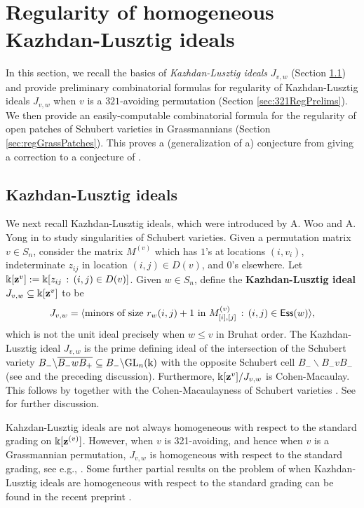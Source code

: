 \documentclass[12pt]{amsart}
\theoremstyle{definition}
\theoremstyle{remark}
\numberwithin{equation}{section}
\newcommand{\Ess}{{\sf Ess}}
\newcommand{\GL}{{\rm GL}}
\begin{document}
\section{Regularity of homogeneous Kazhdan-Lusztig ideals}\label{sec:vexGr}

In this section, we recall the basics of \emph{Kazhdan-Lusztig ideals} $J_{v,w}$ (Section \ref{sec:KLBackground}) and provide preliminary combinatorial formulas for regularity of Kazhdan-Lusztig ideals $J_{v,w}$ when $v$ is a $321$-avoiding permutation (Section \ref{sec:321RegPrelims}). We then provide an easily-computable  combinatorial formula for the regularity of open patches of Schubert varieties in Grassmannians (Section \ref{sec:regGrassPatches}). This proves a (generalization of a) conjecture from \cite{RRRSW} giving a correction to a conjecture of \cite{KLSS}.

\subsection{Kazhdan-Lusztig ideals}\label{sec:KLBackground}
We next recall Kazhdan-Lusztig ideals, which were introduced by A. Woo and A. Yong in \cite{WooYongSings} to study singularities of Schubert varieties. Given a permutation matrix $v\in S_n$, consider the matrix $M^{(v)}$ which has $1$'s at locations $(i,v_i)$,  indeterminate $z_{ij}$ in location $(i,j)\in D(v)$, and $0$'s elsewhere. Let $\Bbbk[{\bf z}^v]:= \Bbbk[z_{ij}\,:  \,(i,j)\in D(v)]$. Given $w\in S_n$, define the \textbf{Kazhdan-Lusztig ideal} $J_{v,w}\subseteq \Bbbk[{\bf z}^v]$ to be
\[
J_{v,w} = \langle \text{minors of size } r_w(i,j)+1 \text{ in } M^{(v)}_{[i],[j]}\,:  \, (i,j)\in \Ess(w)\rangle,
\]
which is not the unit ideal precisely when $w\leq v$ in Bruhat order. 
 The Kazhdan-Lusztig ideal $J_{v,w}$ is the prime defining ideal of the intersection of the Schubert variety $B_-\backslash \overline{B_- w B_+}\subseteq B_-\backslash \GL_n(\Bbbk)$ with the opposite Schubert cell $B_-\backslash B_-vB_-$ (see \cite[Corollary 3.3]{WooYongSings} and the preceding discussion). Furthermore, $\Bbbk[{\bf z}^{v}]/J_{v,w}$ is Cohen-Macaulay. This follows by \cite[Lemma A.4]{Kazhdan-Lusztig} together with the Cohen-Macaulayness of Schubert varieties \cite{Ramanathan}. See \cite[Section 3.2]{WooYongSings} for further discussion. 
 
 
 Kahzdan-Lusztig ideals are not always homogeneous with respect to the standard grading on $\Bbbk[{\bf z}^{(v)}]$. However, when $v$ is 321-avoiding, and hence when $v$ is a Grassmannian permutation, $J_{v,w}$ is homogeneous with respect to the standard grading, see e.g., \cite[Footnote on pg. 25]{Knutson-Frob}.
Some further partial results on the problem of when Kazhdan-Lusztig ideals are homogeneous with respect to the standard grading \cite[Problem 5.5]{WooYongSings} can be found in the recent preprint \cite{Neye}.
 
\end{document}
